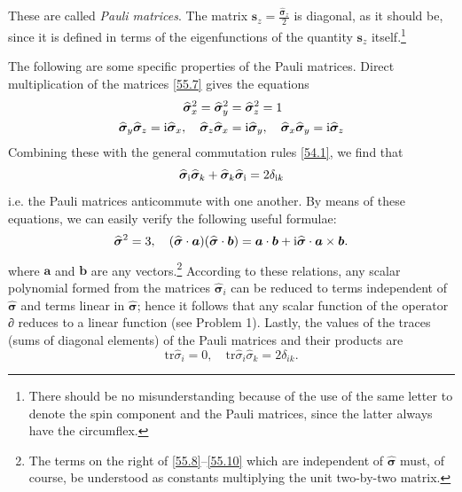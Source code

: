These are called \textit{Pauli matrices}. The matrix $ \hat{\bm{s}}_z=\frac{\hat{\bm{\sigma}}_z}{2} $ is diagonal, as it should be, since it is defined in terms of the eigenfunctions of the quantity $ \bm{s}_z $ itself.\footnote{There should be no misunderstanding because of the use of the same letter to denote the spin component and the Pauli matrices, since the latter always have the circumflex.
}

The following are some specific properties of the Pauli matrices. Direct multiplication of the matrices \eqref{55.7} gives the equations
\begin{equation}\label{55.8}
\begin{split}
\widehat{\bm{\sigma}}_x^2=\widehat{\bm{\sigma}}_y^2&=\widehat{\bm{\sigma}}_z^2=1\\
\widehat{\bm{\sigma}}_y\widehat{\bm{\sigma}}_z=\mathrm{i}\widehat{\bm{\sigma}}_x,\quad\widehat{\bm{\sigma}}_z\widehat{\bm{\sigma}}_x&=\mathrm{i}\widehat{\bm{\sigma}}_y,\quad\widehat{\bm{\sigma}}_x\widehat{\bm{\sigma}}_y=\mathrm{i}\widehat{\bm{\sigma}}_z
\end{split}
\end{equation}
Combining these with the general commutation rules \eqref{54.1}, we find that
\begin{equation}\label{55.9}
\widehat{\bm{\sigma}}_{\mathrm{i}}\widehat{\bm{\sigma}}_k+\widehat{\bm{\sigma}}_k\widehat{\bm{\sigma}}_{\mathrm{i}}=2\delta_{\mathrm{i} k}
\end{equation}
i.e. the Pauli matrices anticommute with one another. By means of these equations, we can easily verify the following useful formulae:
\begin{equation}\label{55.10}
\widehat{\bm{\sigma}}^2=3,\quad (\widehat{\bm{\sigma}}\cdot\bm{a})(\widehat{\bm{\sigma}}\cdot\bm{b})=\bm{a}\cdot\bm{b}+\mathrm{i}\widehat{\bm{\sigma}}\cdot\bm{a}\times\bm{b}.
\end{equation}
where $ \bm{a} $ and $ \bm{b} $ are any vectors.\footnote{The terms on the right of \eqref{55.8}–\eqref{55.10} which are independent of $\hat{\bm{\sigma}}$ must, of course, be understood as constants multiplying the unit two-by-two matrix.
} According to these relations, any scalar polynomial formed from the matrices $ \hat{\bm{\sigma}}_i $ can be reduced to terms independent of $ \hat{\bm{\sigma}} $ and terms linear in $ \hat{\bm{\sigma}} $; hence it follows that any scalar function of the operator ∂ reduces to a linear function (see Problem 1). Lastly, the values of the traces (sums of diagonal elements) of the Pauli matrices and their products are
\begin{equation}\label{55.11}
\mathrm{tr}\hat{\sigma}_i=0,\quad\mathrm{tr}\hat{\sigma}_i\hat{\sigma}_k=2\delta_{ik}.
\end{equation}


